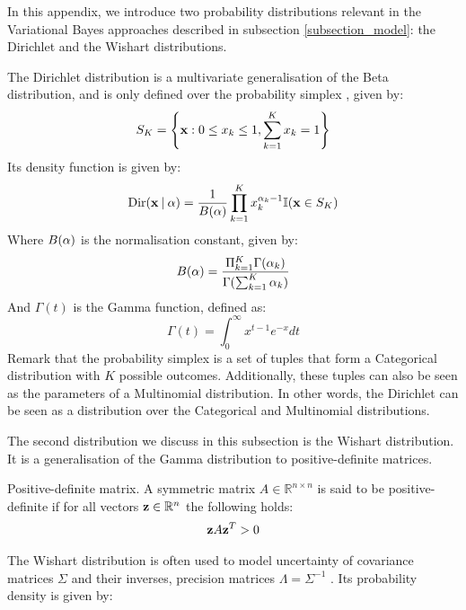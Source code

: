 \documentclass[../main.tex]{subfiles}
\begin{document}
 \label{subsection_dirwish}
In this appendix, we introduce two probability distributions relevant in the Variational Bayes approaches described in subsection \ref{subsection_model}: the Dirichlet and the Wishart distributions. 
\par The Dirichlet distribution is a multivariate generalisation of the Beta distribution, and is only defined over the probability simplex \cite{Murphy2012}, given by:
\begin{align*}
S_K = \left\{\mathbf{x} : 0 \leq x_k \leq 1, \sum_{k=1}^Kx_k = 1\right\}
\end{align*}
Its density function is given by:
\begin{equation} \label{eq:dirichlet}
\text{Dir}(\mathbf{x} \:\vert\: \mathbf{\alpha}) = \frac{1}{B(\mathbf{\alpha})} \prod_{k=1}^Kx_k^{\alpha_k-1}\mathbb{I}(\mathbf{x}\in S_K)
\end{equation}
Where $B(\mathbf{\alpha})$ is the normalisation constant, given by:
\begin{equation}
B(\mathbf{\alpha}) = \frac{\Pi_{k=1}^K\Gamma(\alpha_k)}{\Gamma(\sum_{k=1}^K\alpha_k)}
\end{equation}
And $\Gamma(t)$ is the Gamma function, defined as:
\begin{equation}\label{eq:gamma}
\Gamma(t) = \int_0^\infty x^{t-1}e^{-x}dt
\end{equation}
Remark that the probability simplex is a set of tuples that form a Categorical distribution with $K$ possible outcomes. Additionally, these tuples can also be seen as the parameters of a Multinomial distribution. In other words, the Dirichlet can be seen as a distribution over the Categorical and Multinomial distributions.
\par The second distribution we discuss in this subsection is the Wishart distribution. It is a generalisation of the Gamma distribution to positive-definite matrices. 
\begin{definition}{Positive-definite matrix.} \label{def_pdmatrix}
A symmetric matrix $A \in \mathbb{R}^{n\times n}$ is said to be positive-definite if for all vectors $\mathbf{z} \in \mathbb{R}^n$ the following holds:
\begin{align*}
\mathbf{z}A\mathbf{z}^T > 0
\end{align*}
\end{definition}
\par The Wishart distribution is often used to model uncertainty of covariance matrices $\Sigma$ and their inverses, precision matrices $\Lambda = \Sigma^{-1}$ \cite{Murphy2012}. Its probability density is given by:
\end{document}
